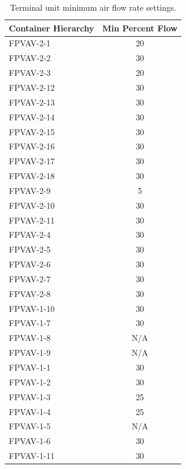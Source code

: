 \begin{table}
\centering
\caption{Terminal unit minimum air flow rate settings.}
\label{tab:MinimumAirFlowRateSettings}
\begin{tabular}{lS}
    \toprule
Container Hierarchy & {Min Percent Flow} \\ \midrule
FPVAV-2-1            & 20                              \\
FPVAV-2-2            & 30                              \\
FPVAV-2-3            & 20                              \\
FPVAV-2-12           & 30                              \\
FPVAV-2-13           & 30                              \\
FPVAV-2-14           & 30                              \\
FPVAV-2-15           & 30                              \\
FPVAV-2-16           & 30                              \\
FPVAV-2-17           & 30                              \\
FPVAV-2-18           & 30                              \\
FPVAV-2-9            & 5                               \\
FPVAV-2-10           & 30                              \\
FPVAV-2-11           & 30                              \\
FPVAV-2-4            & 30                              \\
FPVAV-2-5            & 30                              \\
FPVAV-2-6            & 30                              \\
FPVAV-2-7            & 30                              \\
FPVAV-2-8            & 30                              \\
FPVAV-1-10           & 30                              \\
FPVAV-1-7            & 30                              \\
FPVAV-1-8            & {N/A}                           \\
FPVAV-1-9            & {N/A}                           \\
FPVAV-1-1            & 30                              \\
FPVAV-1-2            & 30                              \\
FPVAV-1-3            & 25                              \\
FPVAV-1-4            & 25                              \\
FPVAV-1-5            & {N/A}                           \\
FPVAV-1-6            & 30                              \\
FPVAV-1-11           & 30               \\ \bottomrule
\end{tabular}
\end{table}





